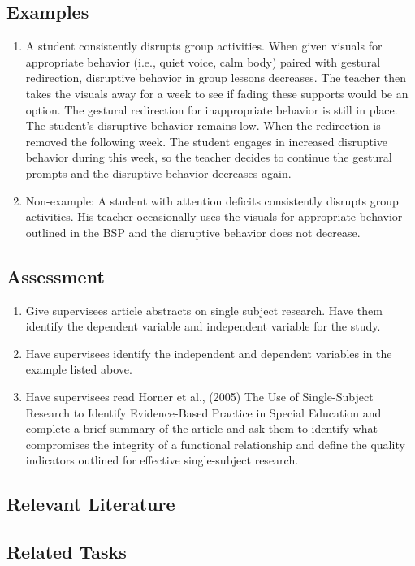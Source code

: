 \subsection{Examples} 
\begin{enumerate}
\item   A student consistently disrupts group activities. When given visuals for appropriate behavior (i.e., quiet voice, calm body) paired with gestural redirection, disruptive behavior in group lessons decreases. The teacher then takes the visuals away for a week to see if fading these supports would be an option. The gestural redirection for inappropriate behavior is still in place. The student's disruptive behavior remains low. When the redirection is removed the following week. The student engages in increased disruptive behavior during this week, so the teacher decides to continue the gestural prompts and the disruptive behavior decreases again. 
\item Non-example: A student with attention deficits consistently disrupts group activities. His teacher occasionally uses the visuals for appropriate behavior outlined in the BSP and the disruptive behavior does not decrease.
\end{enumerate}

\subsection{Assessment}
\begin{enumerate}
\item Give supervisees article abstracts on single subject research. Have them identify the dependent variable and independent variable for the study.
\item Have supervisees identify the independent and dependent variables in the example listed above.
\item Have supervisees read Horner et al., (2005) The Use of Single-Subject Research to Identify Evidence-Based Practice in Special Education and complete a brief summary of the article and ask them to identify what compromises the integrity of a functional relationship and define the quality indicators outlined for effective single-subject research.
\end{enumerate}
%
\subsection{Relevant Literature} 
\begin{refsection}
\nocite{cooper2007applied,horner2005use}
\printbibliography[heading=none]
\end{refsection}%

\subsection{Related Tasks}
\fourbFour{}\\
\fourbFive{}\\
\fourbSix{}\\
\fourbSeven{}\\
\fourbNine{}\\
\fourbEleven{}\\ 
\fourhFour{}\\
\fouriOne{}\\
